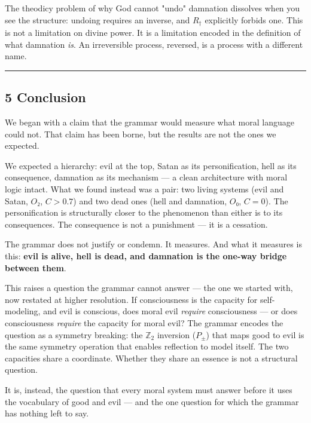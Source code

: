\documentclass[12pt,a4paper]{article}
\begin{document}
The theodicy problem of why God cannot "undo" damnation dissolves when you see the structure: undoing requires an inverse, and $R_{\dagger}$ explicitly forbids one. This is not a limitation on divine power. It is a limitation encoded in the definition of what damnation \emph{is}. An irreversible process, reversed, is a process with a different name.

\begin{center}
\rule{0.5\textwidth}{0.4pt}
\end{center}

\subsection{5 Conclusion}

We began with a claim that the grammar would measure what moral language could not. That claim has been borne, but the results are not the ones we expected.

We expected a hierarchy: evil at the top, Satan as its personification, hell as its consequence, damnation as its mechanism --- a clean architecture with moral logic intact. What we found instead was a pair: two living systems (evil and Satan, $O₂$, $C > 0.7$) and two dead ones (hell and damnation, $O₀$, $C = 0$). The personification is structurally closer to the phenomenon than either is to its consequences. The consequence is not a punishment --- it is a cessation.

The grammar does not justify or condemn. It measures. And what it measures is this: \textbf{evil is alive, hell is dead, and damnation is the one-way bridge between them}.

This raises a question the grammar cannot answer --- the one we started with, now restated at higher resolution. If consciousness is the capacity for self-modeling, and evil is conscious, does moral evil \emph{require} consciousness --- or does consciousness \emph{require} the capacity for moral evil? The grammar encodes the question as a symmetry breaking: the $\mathbb{Z}_2$ inversion ($P_{\pm}$) that maps good to evil is the same symmetry operation that enables reflection to model itself. The two capacities share a coordinate. Whether they share an essence is not a structural question.

It is, instead, the question that every moral system must answer before it uses the vocabulary of good and evil --- and the one question for which the grammar has nothing left to say.
\end{document}
